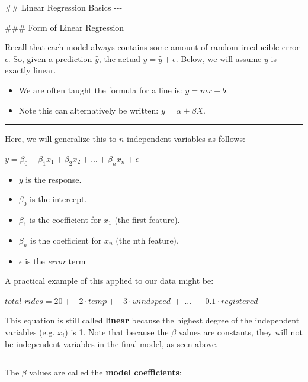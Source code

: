 \documentclass[11pt]{article}
\providecommand{\tightlist}{%
      \setlength{\itemsep}{0pt}\setlength{\parskip}{0pt}}
\begin{document}
     \#\# Linear Regression Basics -\/-\/-

     \#\#\# Form of Linear Regression

Recall that each model always contains some amount of random irreducible
error \(\epsilon\). So, given a prediction \(\hat{y}\), the actual
\(y = \hat{y} + \epsilon\). Below, we will assume \(y\) is exactly
linear.

\begin{itemize}
\tightlist
\item
  We are often taught the formula for a line is: \(y = mx + b\).
\item
  Note this can alternatively be written: \(y = \alpha + \beta X\).
\end{itemize}

\begin{center}\rule{0.5\linewidth}{\linethickness}\end{center}

Here, we will generalize this to \(n\) independent variables as follows:

\(y = \beta_0 + \beta_1x_1 + \beta_2x_2 + ... + \beta_nx_n + \epsilon\)

\begin{itemize}
\tightlist
\item
  \(y\) is the response.
\item
  \(\beta_0\) is the intercept.
\item
  \(\beta_1\) is the coefficient for \(x_1\) (the first feature).
\item
  \(\beta_n\) is the coefficient for \(x_n\) (the nth feature).
\item
  \(\epsilon\) is the \emph{error} term
\end{itemize}

A practical example of this applied to our data might be:

\(total\_rides = 20 + -2 \cdot temp + -3 \cdot windspeed\ +\ ...\ +\ 0.1 \cdot registered\)

This equation is still called \textbf{linear} because the highest degree
of the independent variables (e.g. \(x_i\)) is 1. Note that because the
\(\beta\) values are constants, they will not be independent variables
in the final model, as seen above.

\begin{center}\rule{0.5\linewidth}{\linethickness}\end{center}

The \(\beta\) values are called the \textbf{model coefficients}:
\end{document}
